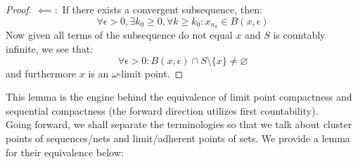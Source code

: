\documentclass[10pt,letterpaper]{article} %
\newtheorem{lem}{Lemma}[section]
\begin{document}
\begin{proof}
$\impliedby:$ If there exists a convergent subsequence, then:
\begin{equation*}
\forall \epsilon > 0, \exists k_0 \geqslant 0, \forall k \geqslant k_0: x_{n_k} \in B(x, \epsilon)
\end{equation*}
Now given all terms of the subsequence do not equal $x$ and $S$ is countably infinite, we see that:
\begin{equation*}
\forall \epsilon > 0: B(x, \epsilon) \cap S \setminus \{x\} \neq \varnothing
\end{equation*}
and furthermore $x$ is an $\omega$-limit point. 
\end{proof}
This lemma is the engine behind the equivalence of limit point compactness and sequential compactness (the forward direction utilizes first countability).\\

Going forward, we shall separate the terminologies so that we talk about cluster points of sequences/nets and limit/adherent points of sets. We provide a lemma for their equivalence below:

\end{document}
